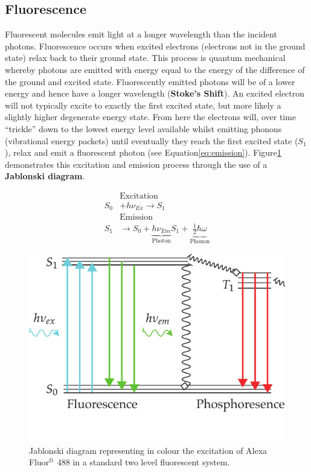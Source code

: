 \subsection{Fluorescence}

Fluorescent molecules emit light at a longer wavelength than the incident photons.
Fluorescence occurs when excited electrons (electrons not in the ground state) relax back to their ground state.
This process is quantum mechanical whereby photons are emitted with energy equal to the energy of the difference of the ground and excited state\cite{Lakowicz2007}.
Fluorescently emitted photons will be of a lower energy and hence have a longer wavelength (\textbf{Stoke's Shift}).
An excited electron will not typically excite to exactly the first excited state, but more likely a slightly higher degenerate energy state.
From here the electrons will, over time ``trickle'' down to the lowest energy level available whilst emitting phonons (vibrational energy packets) until eventually they reach the first excited state (\(S_1\)), relax and emit a fluorescent photon (see Equation\eqref{eq:emission}).
Figure\ref{fig:jablonski} demonstrates this excitation and emission process through the use of a \textbf{Jablonski diagram}.

\begin{align}
&\text{Excitation}\nonumber \\
S_0 &+ h \nu_{Ex} \rightarrow S_1 \label{eq:excitation}\\
&\text{Emission}\nonumber \\
S_1 &\rightarrow S_0 + \underbrace{h \nu_{Em}}_{\text{Photon}}  S_1 + \underbrace{\frac{1}{2} \hbar \omega}_{\text{Phonon}} \label{eq:emission}
\end{align}

\begin{figure}
\centering
\includegraphics[width=0.7\linewidth]{jablonski_triplet}
\caption[Standard jablonski diagram]{Jablonski diagram representing in colour the excitation of Alexa Fluor\(^{\copyright}\) 488 in a standard two level fluorescent system.}\label{fig:jablonski}
\end{figure}



